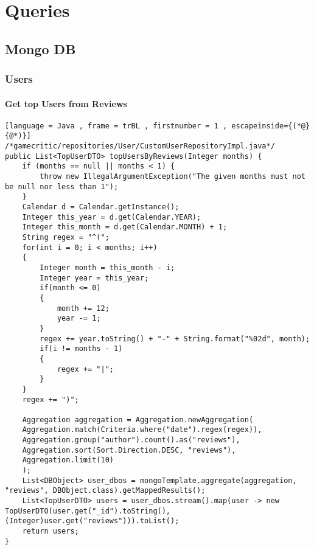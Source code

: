 \chapter{Queries}
\section{Mongo DB}
\subsection{Users}
\subsubsection{Get top Users from Reviews}
\begin{lstlisting}[language = Java , frame = trBL , firstnumber = 1 , escapeinside={(*@}{@*)}]
/*gamecritic/repositories/User/CustomUserRepositoryImpl.java*/
public List<TopUserDTO> topUsersByReviews(Integer months) {
	if (months == null || months < 1) {
		throw new IllegalArgumentException("The given months must not be null nor less than 1");
	}
	Calendar d = Calendar.getInstance();
	Integer this_year = d.get(Calendar.YEAR);
	Integer this_month = d.get(Calendar.MONTH) + 1;
	String regex = "^(";
	for(int i = 0; i < months; i++)
	{
		Integer month = this_month - i;
		Integer year = this_year;
		if(month <= 0)
		{
			month += 12;
			year -= 1;
		}
		regex += year.toString() + "-" + String.format("%02d", month);
		if(i != months - 1)
		{
			regex += "|";
		}
	}
	regex += ")";
	
	Aggregation aggregation = Aggregation.newAggregation(
	Aggregation.match(Criteria.where("date").regex(regex)),
	Aggregation.group("author").count().as("reviews"),
	Aggregation.sort(Sort.Direction.DESC, "reviews"),
	Aggregation.limit(10)
	);
	List<DBObject> user_dbos = mongoTemplate.aggregate(aggregation, "reviews", DBObject.class).getMappedResults();
	List<TopUserDTO> users = user_dbos.stream().map(user -> new TopUserDTO(user.get("_id").toString(), (Integer)user.get("reviews"))).toList();
	return users;
}
\end{lstlisting}

